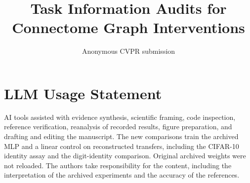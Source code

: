 \documentclass[10pt,twocolumn,letterpaper]{article}
\title{Task Information Audits for Connectome Graph Interventions}
\author{Anonymous CVPR submission}
\begin{document}
\maketitle







\clearpage
\section*{LLM Usage Statement}
AI tools assisted with evidence synthesis, scientific framing, code inspection,
reference verification, reanalysis of recorded results, figure preparation,
and drafting and editing the manuscript. The new comparisons train the archived MLP and a linear control on reconstructed
transfers, including the CIFAR-10 identity assay and the digit-identity comparison. Original archived weights were not reloaded. The authors take responsibility for the content,
including the interpretation of the archived experiments and the accuracy of
the references.
{\small}
\end{document}
